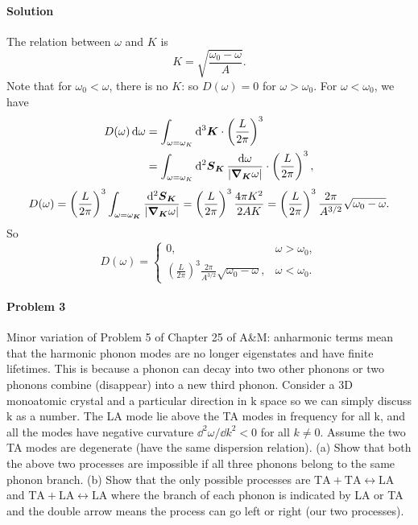 \documentclass[hyperref, a4paper]{article}
\begin{document}
\paragraph{Solution} The relation between $\omega$ and $K$ is 
\begin{equation}
    K = \sqrt{\frac{\omega_0 - \omega}{A}}.
\end{equation}
Note that for $\omega_0 < \omega$,
there is no $K$: so $D(\omega) = 0$ for $\omega > \omega_0$.
For $\omega < \omega_0$, we have 
\begin{equation}
    \begin{aligned}
        D(\omega) \dd{\omega} &= \int_{\omega = \omega_K} \dd[3]{\vb*{K}} \cdot \left(\frac{L}{2\pi}\right)^3 \\
        &= \int_{\omega = \omega_K} \dd[2]{\vb*{S}_{\vb*{K}}} \frac{\dd{\omega}}{\abs{\grad_{\vb*{K}} \omega}}
        \cdot \left(\frac{L}{2\pi}\right)^3 ,
    \end{aligned}
\end{equation}
\begin{equation}
    D(\omega) = \left(\frac{L}{2\pi}\right)^3 
    \int_{\omega=\omega_{\vb*{K}}} \frac{\dd[2]{\vb*{S}_{\vb*{K}}}}{\abs{\grad_{\vb*{K}} \omega}}
    = \left(\frac{L}{2\pi}\right)^3 \frac{4\pi K^2}{2 A K} 
    = \left(\frac{L}{2\pi}\right)^3 \frac{2\pi}{A^{3/2}} \sqrt{\omega_0 - \omega}.
\end{equation}
So 
\begin{equation}
    D(\omega) = \begin{cases}
        0, & \omega > \omega_0, \\
        \left(\frac{L}{2\pi}\right)^3 \frac{2\pi}{A^{3/2}} \sqrt{\omega_0 - \omega},
        & \omega < \omega_0.
    \end{cases}
\end{equation}

\paragraph{Problem 3} Minor variation of Problem 5 of Chapter 25 of A\&M: anharmonic terms mean that the harmonic phonon modes are no longer eigenstates and have finite lifetimes. This is because a phonon can decay into two other phonons or two phonons combine (disappear) into a new third phonon. Consider a 3D monoatomic crystal and a particular direction in $\mathrm{k}$ space so we can simply discuss $\mathrm{k}$ as a number. The LA mode lie above the TA modes in frequency for all $\mathrm{k}$, and all the modes have negative curvature $\dd^2 \omega / \dd k^2<0$ for all $k \neq 0$. Assume the two TA modes are degenerate (have the same dispersion relation).
(a) Show that both the above two processes are impossible if all three phonons belong to the same phonon branch.
(b) Show that the only possible processes are $\mathrm{TA}+\mathrm{TA} \leftrightarrow \mathrm{LA}$ and $\mathrm{TA} +\mathrm{LA} \leftrightarrow \mathrm{LA}$ where the branch of each phonon is indicated by LA or TA and the double arrow means the process can go left or right (our two processes).
\end{document}
